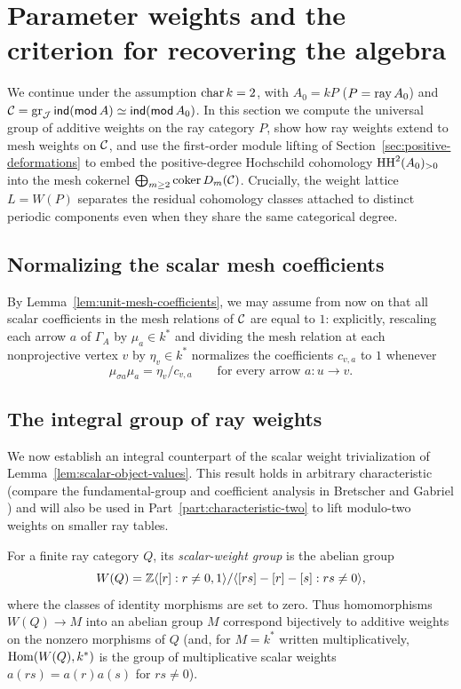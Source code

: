 \section{Parameter weights and the criterion for recovering the algebra}
\label{sec:weights-and-parameters}

We continue under the assumption $\operatorname{char} k=2$, with $A_0=kP$ ($P=\operatorname{ray} A_0$)
and $\mathcal C=\operatorname{gr}_\mathcal J\operatorname{\mathsf{ind}}(\operatorname{\mathsf{mod}} A)\simeq\operatorname{\mathsf{ind}}(\operatorname{\mathsf{mod}} A_0)$. In this section we compute
the universal group of additive weights on the ray category $P$, show how
ray weights extend to mesh weights on $\mathcal C$, and use the first-order module
lifting of Section~\ref{sec:positive-deformations} to embed the
positive-degree Hochschild cohomology $\operatorname{HH}^2(A_0)_{>0}$ into the mesh
cokernel $\bigoplus_{m\geq2}\operatorname{coker}D_m(\mathcal C)$. Crucially, the
weight lattice $L=W(P)$ separates the residual cohomology classes attached to
distinct periodic components even when they share the same categorical
degree.

\subsection{Normalizing the scalar mesh coefficients}

By Lemma~\ref{lem:unit-mesh-coefficients}, we may assume from now on that all
scalar coefficients in the mesh relations of $\mathcal C$ are equal to $1$:
explicitly, rescaling each arrow $a$ of $\Gamma_A$ by $\mu_a\in k^*$ and
dividing the mesh relation at each nonprojective vertex $v$ by $\eta_v\in k^*$
normalizes the coefficients $c_{v,a}$ to $1$ whenever
\begin{equation}
 \mu_{\sigma a}\mu_a=\eta_v/c_{v,a}\qquad\text{for every arrow }a:u\to v.
 \label{eq:global-mesh-scales}
\end{equation}

\subsection{The integral group of ray weights}

We now establish an integral counterpart of the scalar weight trivialization
of Lemma~\ref{lem:scalar-object-values}. This result holds in arbitrary
characteristic (compare the fundamental-group and coefficient analysis in
Bretscher and Gabriel \cite[Sections~2.11--2.12]{BretscherGabriel}) and will
also be used in Part~\ref{part:characteristic-two} to lift modulo-two
weights on smaller ray tables.

\begin{definition}
\label{def:scalar-weight-group}
For a finite ray category $Q$, its \emph{scalar-weight group} is the abelian
group
\[
 W(Q)=\mathbb Z\langle[r]:r\ne0,1\rangle/
       \langle[rs]-[r]-[s]:rs\ne0\rangle,
\]
where the classes of identity morphisms are set to zero. Thus homomorphisms
$W(Q)\to M$ into an abelian group $M$ correspond bijectively to additive
weights on the nonzero morphisms of $Q$ (and, for $M=k^*$ written
multiplicatively, $\operatorname{Hom}(W(Q),k^*)$ is the group of multiplicative scalar
weights $a(rs)=a(r)a(s)$ for $rs\ne0$).
\end{definition}

